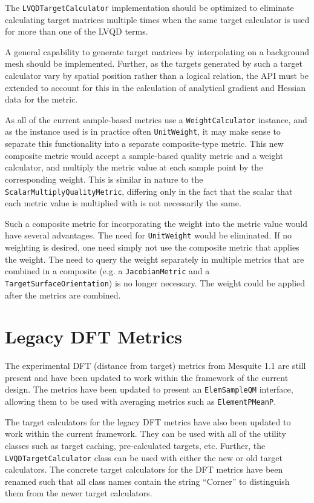 \documentclass{article}
\begin{document}
The \texttt{LVQDTargetCalculator} implementation should be optimized to eliminate calculating target matrices multiple times when the same target calculator is used for more than one of the LVQD terms.

A general capability to generate target matrices by interpolating on a background mesh should be implemented.  Further, as the targets generated by such a target calculator vary by spatial position rather than a logical relation, the API must be extended to account for this in the calculation of analytical gradient and Hessian data for the metric.

As all of the current sample-based metrics use a \texttt{WeightCalculator} instance, and as the instance used is in practice often \texttt{UnitWeight}, it may make sense to separate this functionality into a separate composite-type metric.  This new composite metric would accept a sample-based quality metric and a weight calculator, and multiply the metric value at each sample point by the corresponding weight.  This is similar in nature to the \texttt{ScalarMultiplyQualityMetric}, differing only in the fact that the scalar that each metric value is multiplied with is not necessarily the same.

Such a composite metric for incorporating the weight into the metric value would have several advantages.  The need for \texttt{UnitWeight} would be eliminated.  If no weighting is desired, one need simply not use the composite metric that applies the weight.  The need to query the weight separately in multiple metrics that are combined in a composite (e.g. a \texttt{JacobianMetric} and a  \texttt{TargetSurfaceOrientation}) is no longer necessary.  The weight could be applied after the metrics are combined.

\section{Legacy DFT Metrics}
\label{sec:DFT}

The experimental DFT (distance from target) metrics from Mesquite 1.1 are still present and have been updated to work within the framework of the current design.  The metrics have been updated to present an \texttt{ElemSampleQM} interface, allowing them to be used with averaging metrics such as \texttt{ElementPMeanP}.

The target calculators for the legacy DFT metrics have also been updated to work within the current framework.  They can be used with all of the utility classes such as target caching, pre-calculated targets, etc.  Further, the \texttt{LVQDTargetCalculator} class can be used with either the new or old target calculators.  The concrete target calculators for the DFT metrics have been renamed such that all class names contain the string ``Corner'' to distinguish them from the newer target calculators.
\end{document}
